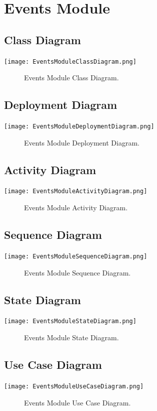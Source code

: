 \documentclass[12pt]{article}
\begin{document}
   
   \section{Events Module}
	
	\subsection{Class Diagram}
        \texttt{[image: EventsModuleClassDiagram.png]}
        \begin{figure}[h]
            \caption{Events Module Class Diagram.}
        \end{figure}
    
    \subsection{Deployment Diagram}
        \texttt{[image: EventsModuleDeploymentDiagram.png]}
        \begin{figure}[h]
            \caption{Events Module Deployment Diagram.}
        \end{figure}
        
    \subsection{Activity Diagram}
        \texttt{[image: EventsModuleActivityDiagram.png]}
        \begin{figure}
            \caption{Events Module Activity Diagram.}
        \end{figure}

    \subsection{Sequence Diagram}
        \texttt{[image: EventsModuleSequenceDiagram.png]}
        \begin{figure}[h]
            \caption{Events Module Sequence Diagram.}
        \end{figure}

	
	\subsection{State Diagram}
       \texttt{[image: EventsModuleStateDiagram.png]}
        \begin{figure}[h]
        	\caption{Events Module State Diagram.}
        \end{figure}
	
	\subsection{Use Case Diagram}
        	\texttt{[image: EventsModuleUseCaseDiagram.png]}
        	\begin{figure}[h]
        		\caption{Events Module Use Case Diagram.}
        	\end{figure}
   
\end{document}
